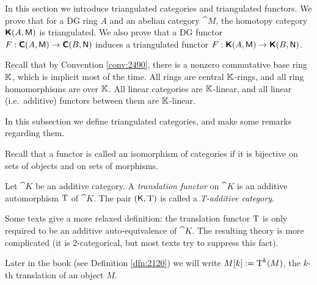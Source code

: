  

\renewcommand{\thisfile}{block2\_190328}  
  
\cleardoublepage
{} 
\label{sec:triangulated}  

\AYcopyright

In this section we introduce triangulated categories and triangulated 
functors. We prove that for a DG ring $A$ and an abelian category  
$\cat{M}$, the homotopy category $\boldsymbol{\mathsf{K}}(A, \operatorname{\mathsf{M}})$
is triangulated. We also prove that a DG functor 
$F : \boldsymbol{\mathsf{C}}(A, \operatorname{\mathsf{M}}) \to \boldsymbol{\mathsf{C}}(B, \operatorname{\mathsf{N}})$
induces a triangulated functor 
$F : \boldsymbol{\mathsf{K}}(A, \operatorname{\mathsf{M}}) \to \boldsymbol{\mathsf{K}}(B, \operatorname{\mathsf{N}})$.

Recall that by Convention \ref{conv:2490}, there is a nonzero 
commutative base ring $\mathbb{K}$, which is implicit most of the time. All rings are 
central $\mathbb{K}$-rings, and all ring homomorphisms are over $\mathbb{K}$. All linear 
categories are $\mathbb{K}$-linear, and all 
linear (i.e.\ additive) functors between them are $\mathbb{K}$-linear. 




In this subsection we define triangulated categories, and make some remarks 
regarding them. 
  
Recall that a functor is called an isomorphism of categories if it is bijective 
on sets of objects and on sets of morphisms. 

\begin{dfn} \label{dfn:1155} 
Let $\cat{K}$ be an additive category. A {\em translation functor} on $\cat{K}$ 
is an additive automorphism $\operatorname{T}$ of $\cat{K}$.
The pair $(\operatorname{\mathsf{K}}, \operatorname{T})$ is called a {\em T-additive category}. 
\end{dfn}

\begin{rem}
Some texts give a more relaxed definition: the translation functor $\operatorname{T}$ is 
only required to be an 
additive auto-equivalence of $\cat{K}$. The resulting theory is more 
complicated (it is $2$-categorical, but most texts try to suppress this fact). 
\end{rem}

Later in the book (see Definition \ref{dfn:2120}) we will write 
$M[k] := \operatorname{T}^k(M)$, the $k$-th translation of an object $M$. 

